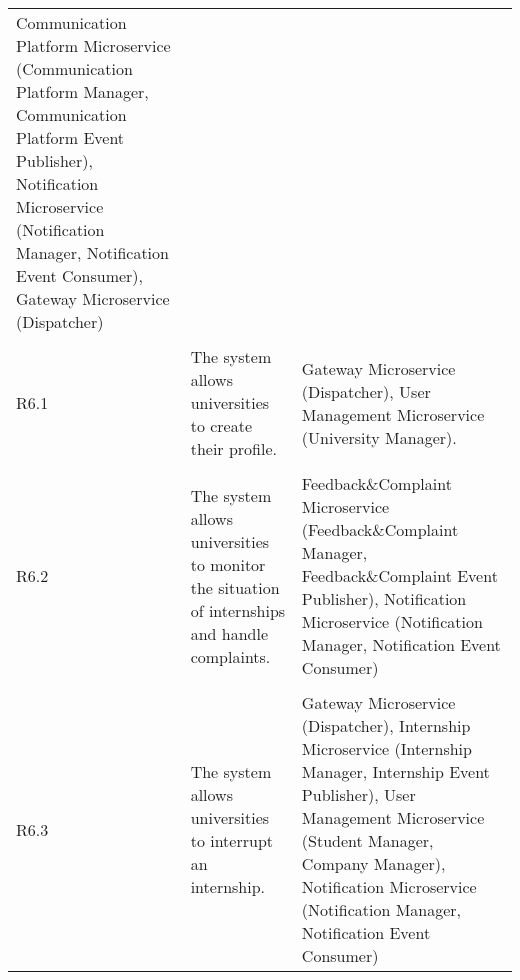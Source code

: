 \begin{longtable}{p{}p{}p{}}
    Communication Platform Microservice (Communication Platform Manager, Communication Platform Event Publisher), Notification Microservice (Notification Manager, Notification Event Consumer), Gateway Microservice (Dispatcher) \\
    \vspace{0.5em}\\
    R6.1 &
    The system allows universities to create their profile. &
    Gateway Microservice (Dispatcher), User Management Microservice (University Manager). \\
    \vspace{0.5em}\\
    R6.2 &
    The system allows universities to monitor the situation of internships and handle complaints. &
    Feedback\&Complaint Microservice (Feedback\&Complaint Manager, Feedback\&Complaint Event Publisher), Notification Microservice (Notification Manager, Notification Event Consumer) \\
    \vspace{0.5em}\\
    R6.3 &
    The system allows universities to interrupt an internship. &
    Gateway Microservice (Dispatcher), Internship Microservice (Internship Manager, Internship Event Publisher), User Management Microservice (Student Manager, Company Manager), Notification Microservice (Notification Manager, Notification Event Consumer) \\

\end{longtable}